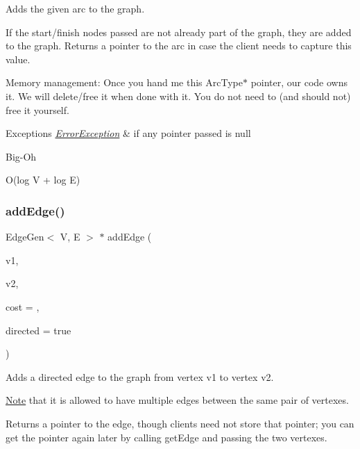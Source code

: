 Adds the given arc to the graph. 

If the start/finish nodes passed are not already part of the graph, they are added to the graph. Returns a pointer to the arc in case the client needs to capture this value.

Memory management\+: Once you hand me this Arc\+Type$\ast$ pointer, our code owns it. We will delete/free it when done with it. You do not need to (and should not) free it yourself.


\begin{DoxyExceptions}{Exceptions}
{\em \mbox{\hyperlink{classErrorException}{Error\+Exception}}} & if any pointer passed is null \\
\hline
\end{DoxyExceptions}
\begin{DoxyRefDesc}{Big-\/\+Oh}
\item[\mbox{\hyperlink{BigOh__BigOh000044}{Big-\/\+Oh}}]O(log V + log E) \end{DoxyRefDesc}
\mbox{\label{classBasicGraphGen_a624c45bedf3986073b0f8a40ab4d85c2}} 
\subsubsection{\texorpdfstring{add\+Edge()}{addEdge()}\hspace{0.1cm}{\footnotesize\ttfamily [1/3]}}
{\footnotesize\ttfamily Edge\+Gen$<$ V, E $>$ $\ast$ add\+Edge (\begin{DoxyParamCaption}\item[{const std\+::string \&}]{v1,  }\item[{const std\+::string \&}]{v2,  }\item[{double}]{cost = {},  }\item[{bool}]{directed = {\ttfamily true} }\end{DoxyParamCaption})}



Adds a directed edge to the graph from vertex v1 to vertex v2. 

\mbox{\hyperlink{classNote}{Note}} that it is allowed to have multiple edges between the same pair of vertexes.

Returns a pointer to the edge, though clients need not store that pointer; you can get the pointer again later by calling get\+Edge and passing the two vertexes.

